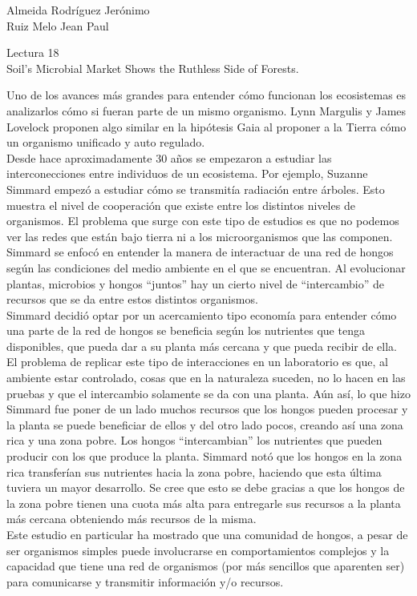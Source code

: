 \documentclass[a4paper, 12pt]{report}
\begin{document}
\begin{flushright}
    Almeida Rodríguez Jerónimo\\
    Ruiz Melo Jean Paul
\end{flushright}

\begin{center}
    {\LARGE Lectura 18}\\
    {\LARGE Soil’s Microbial Market Shows the Ruthless Side of Forests.}
\end{center}

Uno de los avances más grandes para entender cómo funcionan los ecosistemas es
analizarlos cómo si fueran parte de un mismo organismo. Lynn Margulis y James
Lovelock proponen algo similar en la hipótesis Gaia al proponer a la Tierra cómo
un organismo unificado y auto regulado.\\

Desde hace aproximadamente 30 años se empezaron a estudiar las interconecciones
entre individuos de un ecosistema. Por ejemplo, Suzanne Simmard empezó a
estudiar cómo se transmitía radiación entre árboles. Esto muestra el nivel de
cooperación que existe entre los distintos niveles de organismos. El problema
que surge con este tipo de estudios es que no podemos ver las redes que están
bajo tierra ni a los microorganismos que las componen.\\

Simmard se enfocó en entender la manera de interactuar de una red de hongos
según las condiciones del medio ambiente en el que se encuentran. Al evolucionar
plantas, microbios y hongos ``juntos'' hay un cierto nivel de ``intercambio'' de
recursos que se da entre estos distintos organismos.\\

Simmard decidió optar por un acercamiento tipo economía para entender cómo una
parte
de la red de hongos se beneficia según los nutrientes que tenga disponibles, que
pueda dar a su planta más cercana y que pueda recibir de ella. El problema de
replicar este tipo de interacciones en un laboratorio es que, al ambiente estar
controlado, cosas que en la naturaleza suceden, no lo hacen en las pruebas y que
el intercambio solamente se da con una planta. Aún
así, lo que hizo Simmard fue poner de un lado muchos recursos que los hongos
pueden procesar y la planta se puede beneficiar de ellos y del otro lado pocos,
creando así una zona rica y una zona pobre. Los hongos ``intercambian'' los
nutrientes que pueden producir con los que produce la planta. Simmard notó que
los hongos en la zona rica transferían sus nutrientes hacia la zona pobre,
haciendo que esta última tuviera un mayor desarrollo. Se cree que esto se debe
gracias a que los hongos de la zona pobre tienen una cuota más alta para
entregarle sus recursos
a la planta más cercana obteniendo más recursos de la misma.\\

Este estudio en particular ha mostrado que una comunidad de hongos, a pesar de
ser organismos simples puede involucrarse en comportamientos complejos y la
capacidad que tiene una red de organismos (por más sencillos que aparenten ser)
para comunicarse y transmitir información y/o recursos.
\end{document}
